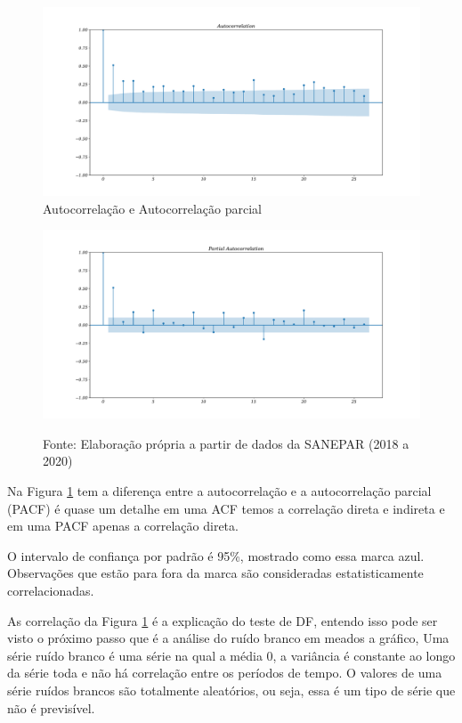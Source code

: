 \begin{figure}[H]
	\centering
		\caption{Autocorrelação e Autocorrelação parcial}
	\label{fig:acf}
	\includegraphics[width=1.1\linewidth]{Resultados/Figuras/acf} 
	
\end{figure}	
\begin{figure}[H]
	\centering
		\includegraphics[width=1.1\linewidth]{Resultados/Figuras/pacf}

	Fonte: Elaboração própria a partir de dados da SANEPAR (2018 a 2020)
\end{figure}


Na Figura \ref{fig:acf} tem a diferença entre a autocorrelação e a autocorrelação parcial (PACF) é quase um detalhe em uma ACF temos a correlação direta e indireta e em uma PACF apenas a correlação direta. 

O intervalo de confiança por padrão é 95\%, mostrado como essa marca azul. Observações que estão para fora da marca são consideradas estatisticamente correlacionadas.

As correlação da Figura \ref{fig:acf} é a explicação do teste de DF, entendo isso pode ser visto o próximo passo que é  a análise do ruído branco em meados a gráfico, Uma série ruído branco é uma série na qual a média 0, a variância é constante ao longo da série toda e não há correlação entre os períodos de tempo. O valores de uma série ruídos brancos são totalmente aleatórios, ou seja, essa é um tipo de série que não é previsível.

